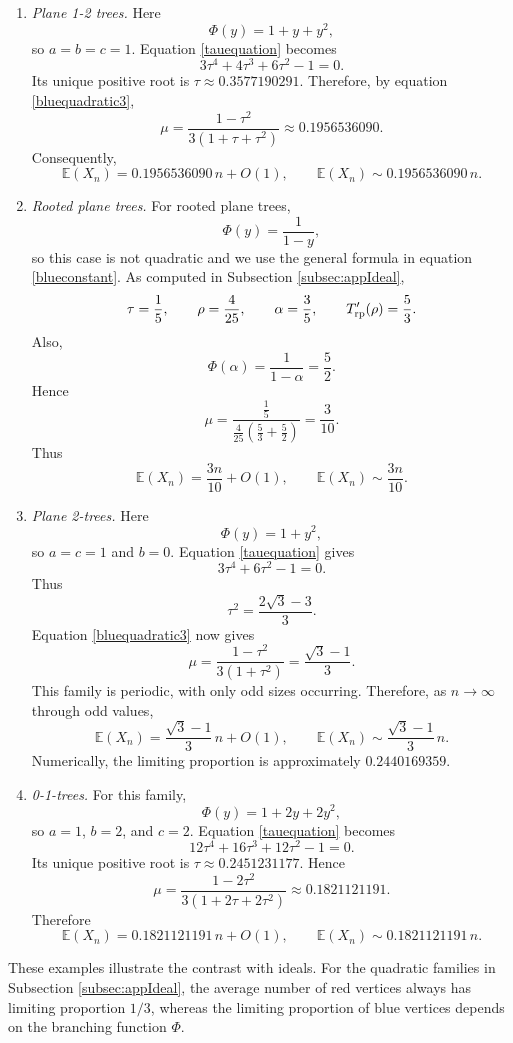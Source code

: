 \documentclass[11pt, onesided]{amsart}
\theoremstyle{remark}
\begin{document}
\begin{enumerate}

\item \emph{Plane 1-2 trees.}
Here
\[
\Phi(y)=1+y+y^2,
\]
so $a=b=c=1$.  Equation \eqref{tauequation} becomes
\[
3\tau^4+4\tau^3+6\tau^2-1=0.
\]
Its unique positive root is
$
\tau\approx 0.3577190291.
$
Therefore, by equation \eqref{bluequadratic3},
\[
\mu
=
\frac{1-\tau^2}{3(1+\tau+\tau^2)}
\approx 0.1956536090.
\]
Consequently,
\[
\mathbb E(X_n)
=
0.1956536090\,n+O(1),
\qquad
\mathbb E(X_n)\sim 0.1956536090\,n.
\]

\item \emph{Rooted plane trees.}
For rooted plane trees,
\[
\Phi(y)=\frac{1}{1-y},
\]
so this case is not quadratic and we use the general formula in equation
\eqref{blueconstant}.  As computed in Subsection \ref{subsec:appIdeal},
\[
\tau=\frac15,
\qquad
\rho=\frac4{25},
\qquad
\alpha=\frac35,
\qquad
T_{\rm rp}'(\rho)=\frac53.
\]
Also,
\[
\Phi(\alpha)=\frac{1}{1-\alpha}=\frac52.
\]
Hence
\[
\mu
=
\frac{\frac15}
{\frac4{25}\left(\frac53+\frac52\right)}
=
\frac3{10}.
\]
Thus
\[
\mathbb E(X_n)=\frac{3n}{10}+O(1),
\qquad
\mathbb E(X_n)\sim\frac{3n}{10}.
\]

\item \emph{Plane 2-trees.}
Here
\[
\Phi(y)=1+y^2,
\]
so $a=c=1$ and $b=0$.  Equation \eqref{tauequation} gives
\[
3\tau^4+6\tau^2-1=0.
\]
Thus
\[
\tau^2=\frac{2\sqrt3-3}{3}.
\]
Equation \eqref{bluequadratic3} now gives
\[
\mu
=
\frac{1-\tau^2}{3(1+\tau^2)}
=
\frac{\sqrt3-1}{3}.
\]
This family is periodic, with only odd sizes occurring.  Therefore, as
$n\to\infty$ through odd values,
\[
\mathbb E(X_n)
=
\frac{\sqrt3-1}{3}\,n+O(1),
\qquad
\mathbb E(X_n)
\sim
\frac{\sqrt3-1}{3}\,n.
\]
Numerically, the limiting proportion is approximately $0.2440169359$.

\item \emph{0-1-trees.}
For this family,
\[
\Phi(y)=1+2y+2y^2,
\]
so $a=1$, $b=2$, and $c=2$.  Equation \eqref{tauequation} becomes
\[
12\tau^4+16\tau^3+12\tau^2-1=0.
\]
Its unique positive root is
$
\tau\approx 0.2451231177.
$
Hence
\[
\mu
=
\frac{1-2\tau^2}{3(1+2\tau+2\tau^2)}
\approx 0.1821121191.
\]
Therefore
\[
\mathbb E(X_n)
=
0.1821121191\,n+O(1),
\qquad
\mathbb E(X_n)\sim 0.1821121191\,n.
\]

\end{enumerate}

These examples illustrate the contrast with ideals.  For the quadratic
families in Subsection \ref{subsec:appIdeal}, the average number of red vertices always has
limiting proportion $1/3$, whereas the limiting proportion of blue vertices
depends on the branching function $\Phi$.
\end{document}
